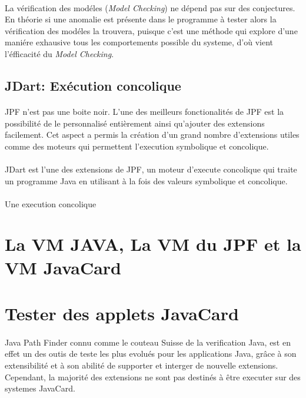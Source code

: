			\paragraph{}
				La vérification des modéles (\textit{Model Checking}) ne dépend pas sur des conjectures. En théorie si une anomalie est présente dans le programme à tester
				alors la vérification des modéles la trouvera, puisque c'est une méthode qui explore d'une maniére exhausive tous les comportements possible du systeme,
				d'où vient l'éfficacité du \textit{Model Checking}.
		\subsection{JDart: Exécution concolique}
			\nocite{JDart}
			\nocite{JDart2}

			\paragraph{}
				\gls{JPF} n'est pas une boite noir. L'une des meilleurs fonctionalités de \gls{JPF} est la possibilité de le personnalisé entièrement
				ainsi qu'ajouter des extensions facilement.
				Cet aspect a permis la création d'un grand nombre d'extensions utiles comme des moteurs
				qui permettent l'execution symbolique et concolique.

			\paragraph{}
				JDart est l'une des extensions de \gls{JPF}, un moteur d'execute concolique qui traite un programme Java
				en utilisant à la fois des valeurs symbolique et concolique.

			\paragraph{}
				Une execution concolique
      
	\section{La VM JAVA, La VM du JPF et la VM JavaCard}
	\section{Tester des applets JavaCard}
	\paragraph{}
		Java Path Finder connu comme le couteau Suisse de la verification Java,
		est en effet un des outis de teste les plus evolués pour les applications Java,
		grâce à son extensibilité et à son abilité de supporter et interger de nouvelle extensions.
		Cependant, la majorité des extensions ne sont pas destinés à être executer sur des systemes JavaCard.